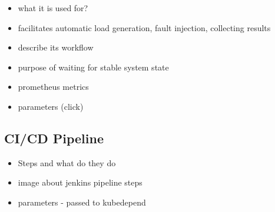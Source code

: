 \begin{itemize}
	\item what it is used for?
	\item facilitates automatic load generation, fault injection, collecting results
	\item describe its workflow
	\item purpose of waiting for stable system state
	\item prometheus metrics
	\item parameters (click)
\end{itemize}

\subsection{CI/CD Pipeline} \label{cicd}

\begin{itemize}
	\item Steps and what do they do
	\item image about jenkins pipeline steps
	\item parameters - passed to kubedepend
\end{itemize}